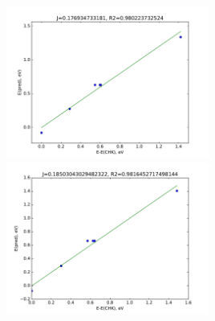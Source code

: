 \documentclass{article}
\begin{document}
\includegraphics[width=0.5\textwidth]{../undoped/PBE0_8/J_fit_naive.pdf}
\includegraphics[width=0.5\textwidth]{../undoped/PBE0_8/J_fit_naive_BFD0p2.pdf}
\end{document}
